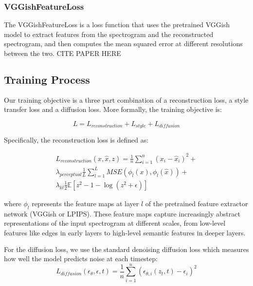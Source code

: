 \subsubsection{VGGishFeatureLoss}
The VGGishFeatureLoss is a loss function that uses the pretrained VGGish model to extract features from the spectrogram and the reconstructed spectrogram, and then computes the mean squared error at different resolutions between the two. CITE PAPER HERE


\subsection{Training Process}

Our training objective is a three part combination of a reconstruction loss, a style transfer loss and a diffusion loss. More formally, the training objective is:

\begin{equation}
    L = L_{reconstruction} + L_{style} + L_{diffusion}
\end{equation}

\noindent Specifically, the reconstruction loss is defined as:

\begin{equation}
    \begin{split}
    L_{reconstruction}(x, \hat{x}, z) = \frac{1}{n}\sum_{i=1}^{n}(x_i - \hat{x}_i)^2 + \\
    \lambda_{perceptual} \frac{1}{L}\sum_{l=1}^{L} MSE(\phi_l(x), \phi_l(\hat{x})) + \\
    \lambda_{kl} \frac{1}{2}\mathbb{E}[z^2 - 1 - \log(z^2 + \epsilon)]
    \end{split}
\end{equation}

\noindent where $\phi_l$ represents the feature maps at layer $l$ of the pretrained feature extractor network (VGGish or LPIPS). These feature maps capture increasingly abstract representations of the input spectrogram at different scales, from low-level features like edges in early layers to high-level semantic features in deeper layers.

\vspace{1em}

\noindent For the diffusion loss, we use the standard denoising diffusion loss which measures how well the model predicts noise at each timestep:
\begin{equation}
L_{diffusion}(\epsilon_\theta, \epsilon, t) = \frac{1}{n}\sum_{i=1}^{n}(\epsilon_{\theta,i}(z_t, t) - \epsilon_i)^2
\end{equation}

